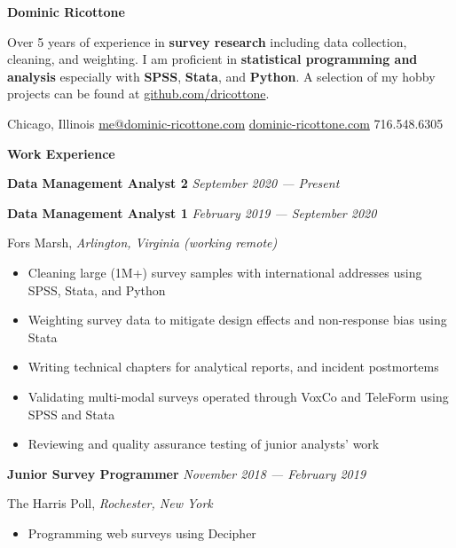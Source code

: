 \documentclass[12pt]{article}
\begin{document}
\centering
{\textbf{\Huge Dominic Ricottone}}



\raggedright
\vspace{.5em}
Over 5 years of experience in \textbf{survey research}
including data collection, cleaning, and weighting.
I am proficient in \textbf{statistical programming and analysis} especially with
\textbf{SPSS}, \textbf{Stata}, and \textbf{Python}.
A selection of my hobby projects can be found at
 \href{https://github.com/dricottone}{github.com/dricottone}.



\centering
\vspace{.5em}
 Chicago, Illinois
\enspace
{} \href{mailto:me@dominic-ricottone.com}{me@dominic-ricottone.com}
\enspace
{} \href{https://www.dominic-ricottone.com}{dominic-ricottone.com}
\enspace
{} 716.548.6305



\raggedright
\vspace{.75em}
\textbf{\Large Work Experience} \hrulefill
\vspace{.5em}

\textbf{Data Management Analyst 2} \hfill \textit{September 2020 --- Present}
\par \textbf{Data Management Analyst 1} \hfill \textit{February 2019 --- September 2020}
\par Fors Marsh, \textit{Arlington, Virginia (working remote)}
\begin{itemize}[]
\item Cleaning large (1M+) survey samples with international addresses using SPSS, Stata, and Python
\item Weighting survey data to mitigate design effects and non-response bias using Stata
\item Writing technical chapters for analytical reports, and incident postmortems
\item Validating multi-modal surveys operated through VoxCo and TeleForm using SPSS and Stata
\item Reviewing and quality assurance testing of junior analysts' work
\end{itemize}

\textbf{Junior Survey Programmer} \hfill \textit{November 2018 --- February 2019}
\par The Harris Poll, \textit{Rochester, New York}
\begin{itemize}[]
\item Programming web surveys using Decipher
\end{itemize}
\end{document}
